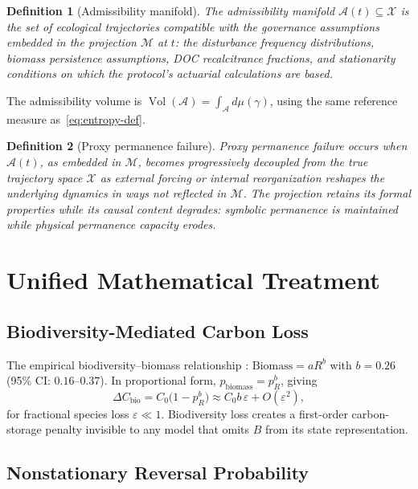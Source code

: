 \documentclass[12pt]{article}
\newtheorem{definition}{Definition}
\newcommand{\Xcal}{\mathcal{X}}
\newcommand{\Mcal}{\mathcal{M}}
\newcommand{\Acal}{\mathcal{A}}
\newcommand{\vol}{\operatorname{Vol}}
\begin{document}
\begin{definition}[Admissibility manifold]
The \emph{admissibility manifold} $\Acal(t)\subseteq\Xcal$ is the set of ecological
trajectories compatible with the governance assumptions embedded in the projection
$\Mcal$ at $t$: the disturbance frequency distributions, biomass persistence assumptions,
DOC recalcitrance fractions, and stationarity conditions on which the protocol's
actuarial calculations are based.
\end{definition}

The admissibility volume is $\vol(\Acal)=\int_{\Acal}d\mu(\gamma)$, using the same
reference measure as~\eqref{eq:entropy-def}.

\begin{definition}[Proxy permanence failure]
\emph{Proxy permanence failure} occurs when $\Acal(t)$, as embedded in $\Mcal$, becomes
progressively decoupled from the true trajectory space $\Xcal$ as external forcing or
internal reorganization reshapes the underlying dynamics in ways not reflected in $\Mcal$.
The projection retains its formal properties while its causal content degrades: symbolic
permanence is maintained while physical permanence capacity erodes.
\end{definition}

\section{Unified Mathematical Treatment}

\subsection{Biodiversity-Mediated Carbon Loss}

The empirical biodiversity--biomass relationship \citep{OConnor2017}:
$\text{Biomass} = aR^b$ with $b=0.26$ (95\% CI: $0.16$--$0.37$). In proportional form,
$p_{\text{biomass}}=p_R^b$, giving
\begin{equation}
\label{eq:bio-loss}
\Delta C_{\text{bio}} = C_0\bigl(1-p_R^b\bigr) \approx C_0 b\,\varepsilon + O(\varepsilon^2),
\end{equation}
for fractional species loss $\varepsilon \ll 1$. Biodiversity loss creates a first-order
carbon-storage penalty invisible to any model that omits $B$ from its state representation.

\subsection{Nonstationary Reversal Probability}
\end{document}
